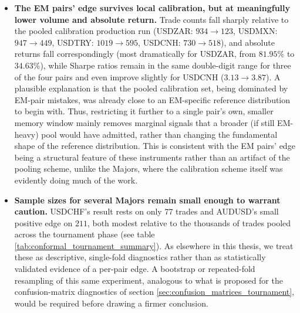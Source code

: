 \documentclass[12pt, a4paper]{article}
\begin{document}
\begin{itemize}
\item \textbf{The EM pairs' edge survives local calibration, but at meaningfully lower volume and absolute return.} Trade counts fall sharply relative to the 
pooled calibration production run (USDZAR: $934 \rightarrow 123$, USDMXN: $947 \rightarrow 449$, USDTRY: $1019 \rightarrow 595$, USDCNH: $730 \rightarrow 518$), and 
absolute returns fall correspondingly (most dramatically for USDZAR, from $81.95\%$ to $34.63\%$), while Sharpe ratios remain in the same double-digit range for 
three of the four pairs and even improve slightly for USDCNH ($3.13 \rightarrow 3.87$). A plausible explanation is that the pooled calibration set, being dominated 
by EM-pair mistakes, was already close to an EM-specific reference distribution to begin with. Thus, restricting it further to a single pair's own, smaller memory 
window mainly removes marginal signals that a broader (if still EM-heavy) pool would have admitted, rather than changing the fundamental shape of the reference 
distribution. This is consistent with the EM pairs' edge being a structural feature of these instruments rather than an artifact of the pooling scheme, unlike the 
Majors, where the calibration scheme itself was evidently doing much of the work.

\item \textbf{Sample sizes for several Majors remain small enough to warrant caution.} USDCHF's result rests on only $77$ trades and AUDUSD's small positive edge on 
$211$, both modest relative to the thousands of trades pooled across the tournament phase (see table \ref{tab:conformal_tournament_summary}). As elsewhere in this 
thesis, we treat these as descriptive, single-fold diagnostics rather than as statistically validated evidence of a per-pair edge. A bootstrap or repeated-fold 
resampling of this same experiment, analogous to what is proposed for the confusion-matrix diagnostics of section \ref{sec:confusion_matrices_tournament}, would be 
required before drawing a firmer conclusion.
\end{itemize}
\end{document}
